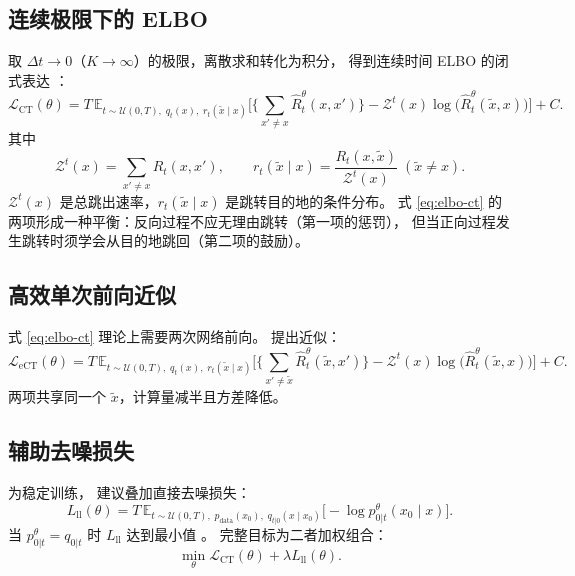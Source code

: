 \documentclass[12pt,a4paper]{ctexbook}
\theoremstyle{definition}
\begin{document}
\subsection{连续极限下的 ELBO}

取 $\Delta t \to 0$（$K \to \infty$）的极限，离散求和转化为积分，
得到连续时间 ELBO 的闭式表达 \cite[§3.2 Proposition 2]{campbell2022ctmc}：
\begin{equation}
\mathcal{L}_{\text{CT}}(\theta) = T \,\mathbb{E}_{t \sim \mathcal{U}(0,T),\; q_t(x),\; r_t(\tilde{x} \mid x)}\Big[ \Big\{\sum_{x' \neq x} \hat{R}_t^\theta(x, x')\Big\} - \mathcal{Z}^t(x) \log \big(\hat{R}_t^\theta(\tilde{x}, x)\big) \Big] + C. \label{eq:elbo-ct}
\end{equation}
其中
\begin{equation}
\mathcal{Z}^t(x) = \sum_{x' \neq x} R_t(x, x'), \qquad
r_t(\tilde{x} \mid x) = \frac{R_t(x, \tilde{x})}{\mathcal{Z}^t(x)}\; (\tilde{x} \neq x). \label{eq:z-and-r}
\end{equation}
$\mathcal{Z}^t(x)$ 是总跳出速率，$r_t(\tilde{x} \mid x)$ 是跳转目的地的条件分布。
式 \eqref{eq:elbo-ct} 的两项形成一种平衡：反向过程不应无理由跳转（第一项的惩罚），
但当正向过程发生跳转时须学会从目的地跳回（第二项的鼓励）。

\subsection{高效单次前向近似}

式 \eqref{eq:elbo-ct} 理论上需要两次网络前向。\cite[Appendix C.4]{campbell2022ctmc} 提出近似：
\begin{equation}
\mathcal{L}_{\text{eCT}}(\theta) = T \,\mathbb{E}_{t \sim \mathcal{U}(0,T),\; q_t(x),\; r_t(\tilde{x} \mid x)}\Big[ \Big\{\sum_{x' \neq \tilde{x}} \hat{R}_t^\theta(\tilde{x}, x')\Big\} - \mathcal{Z}^t(x) \log \big(\hat{R}_t^\theta(\tilde{x}, x)\big) \Big] + C. \label{eq:elbo-ect}
\end{equation}
两项共享同一个 $\tilde{x}$，计算量减半且方差降低。

\subsection{辅助去噪损失}

为稳定训练，\cite[Appendix D]{campbell2022ctmc} 建议叠加直接去噪损失：
\begin{equation}
L_{\text{ll}}(\theta) = T \,\mathbb{E}_{t \sim \mathcal{U}(0,T),\; p_{\text{data}}(x_0),\; q_{t|0}(x \mid x_0)}\big[ -\log p_{0|t}^\theta(x_0 \mid x) \big]. \label{eq:ll-loss}
\end{equation}
当 $p_{0|t}^\theta = q_{0|t}$ 时 $L_{\text{ll}}$ 达到最小值 \cite[Proposition 8]{campbell2022ctmc}。
完整目标为二者加权组合：
\begin{equation}
\min_\theta \mathcal{L}_{\text{CT}}(\theta) + \lambda L_{\text{ll}}(\theta). \label{eq:combined-loss}
\end{equation}
\end{document}
